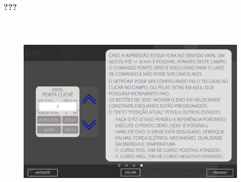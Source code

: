 \newpage
\thispagestyle{fancy}
\vspace*{\fill}
\subsubsection{\small{???}}
\begin{figure}[h]
  \centering
  \includegraphics[width=576px,height=360px]{src/imagesFlexo/04-printter/02-printter/settings/e-4.png}
   \label{}
\end{figure}
\vspace*{\fill}
